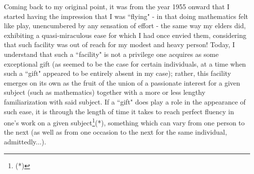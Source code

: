 Coming back to my original point, it was from the year 1955 onward that I started having the impression that I was ``flying" - in that doing mathematics felt like play, unencumbered by any sensation of effort - the same way my elders did, exhibiting a quasi-miraculous ease for which I had once envied them, considering that such facility was out of reach for my modest and heavy person! Today, I understand that such a ``facility" is not a privilege one acquires as some exceptional gift (as seemed to be the case for certain individuals, at a time when such a ``gift" appeared to be entirely absent in my case); rather, this facility emerges on its own as the fruit of the union of a passionate interest for a given subject (such as mathematics) together with a more or less lengthy familiarization with said subject. If a ``gift" does play a role in the appearance of such ease, it is through the length of time it takes to reach perfect fluency in one's work on a given subject\footnote{(*)}(*), something which can vary from one person to the next (as well as from one occasion to the next for the same individual, admittedly...).

